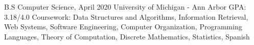 

\begin{cventries}

  \cventry
    {B.S Computer Science, April 2020} %
    {University of Michigan - Ann Arbor} %
    {GPA: 3.18/4.0} %
    {} %
    {Coursework: Data Structures and Algorithms, Information Retrieval, Web Systems, Software Engineering, Computer Organization, Programming Languages, Theory of Computation, Discrete Mathematics, Statistics, Spanish}
\end{cventries}
